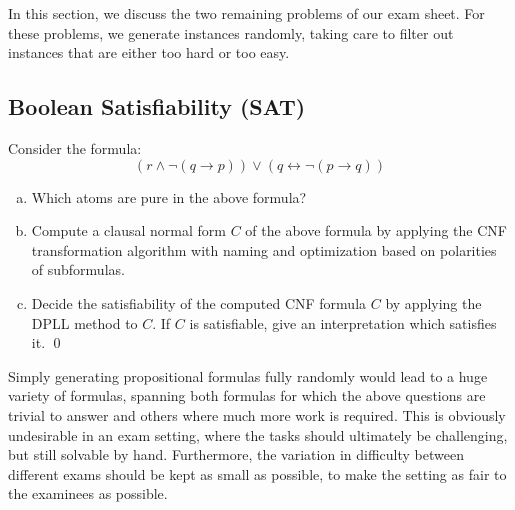In this section, we discuss the two remaining problems of our exam sheet.
For these problems, we generate instances randomly,
taking care to filter out instances that are either too hard or too easy.

\subsection{Boolean Satisfiability (SAT)}\label{sec:sat}

\begin{mdframed}
    \begin{example}
        Consider the formula:
        \[
            ( r \land \lnot ( q \rightarrow p ) ) \lor ( q \leftrightarrow \lnot ( p \rightarrow q ) )
        \]
        \begin{enumerate}[(a)]
            \item
                Which atoms are pure in the above formula?
            \item\label{subtask:sat-cnf}
                Compute a clausal normal form $C$ of the above formula by
                applying the CNF transformation algorithm with naming and
                optimization based on polarities of subformulas.
            \item
                Decide the satisfiability of the computed CNF formula $C$
                by applying the DPLL method to $C$. If $C$ is
                satisfiable, give an interpretation which
                satisfies it.
                \qed
        \end{enumerate}
    \end{example}
\end{mdframed}


Simply generating propositional formulas fully randomly would lead
to a huge variety of formulas,
spanning both formulas for which the above questions are trivial to answer
and others where much more work is required.
This is obviously undesirable in an exam setting,
where the tasks should ultimately be challenging, but still solvable by hand.
Furthermore,
the variation in difficulty between different exams should be kept as small as possible,
to make the setting as fair to the examinees as possible.

